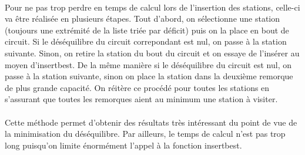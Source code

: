 \documentclass[a4paper, 11pt]{article} %
\begin{document}
\paragraph*{}
Pour ne pas trop perdre en temps de calcul lors de l'insertion des stations, celle-ci va être réalisée en plusieurs étapes. Tout d'abord, on sélectionne une station (toujours une extrémité de la liste triée par déficit) puis on la place en bout de circuit. Si le déséquilibre du circuit correpondant est nul, on passe à la station suivante. Sinon, on retire la station du bout du circuit et on essaye de l'insérer au moyen d'insertbest. De la même manière si le déséquilibre du circuit est nul, on passe à la station suivante, sinon on place la station dans la deuxième remorque de plus grande capacité. On réitère ce procédé pour toutes les stations en s'assurant que toutes les remorques aient au minimum une station à visiter.

\paragraph*{}
Cette méthode permet d'obtenir des résultats très intéressant du point de vue de la minimisation du déséquilibre. Par ailleurs, le temps de calcul n'est pas trop long puisqu'on limite énormément l'appel à la fonction insertbest.
\end{document}
